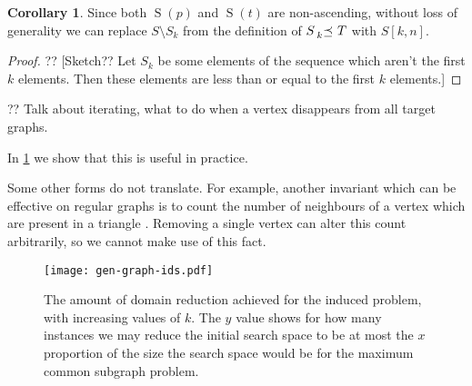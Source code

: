 \documentclass[letterpaper]{article}
\theoremstyle{definition}
\newtheorem{corollary}{Corollary}
\newcommand{\lesspreceq}[1]{\prescript{}{#1}{\preceq}\ }
\newcommand{\nds}{\operatorname{S}}
\newcommand{\todo}[1]{{\color{red} {?? [}{#1}{]}}}
\begin{document}
\begin{corollary}
Since both $\nds(p)$ and $\nds(t)$ are non-ascending, without loss of generality we can replace
$S \setminus S_k$ from the definition of $S \lesspreceq{k} T$ with $S[k, n]$.
\end{corollary}

\begin{proof}
\todo{Sketch?? Let $S_k$ be some elements of the sequence which aren't the first $k$ elements.  Then these elements are less than or equal to the first $k$ elements.}
\end{proof}



?? Talk about iterating, what to do when a vertex disappears from all target graphs.

In \cref{figure:ids} we show that this is useful in practice.

Some other forms do not translate. For example, another invariant which can be effective on regular
graphs is to count the number of neighbours of a vertex which are present in a triangle \cite{mckay2014practical}. Removing a single vertex can alter this count arbitrarily, so we cannot make use of this fact.

\begin{figure}
    \centering
    \texttt{[image: gen-graph-ids.pdf]}
    \caption{The amount of domain reduction achieved for the induced problem, with increasing values
    of $k$. The $y$ value shows for how many instances we may reduce the initial search space to be
    at most the $x$ proportion of the size the search space would be for the maximum common subgraph
    problem.}\label{figure:ids}
\end{figure}
\end{document}
